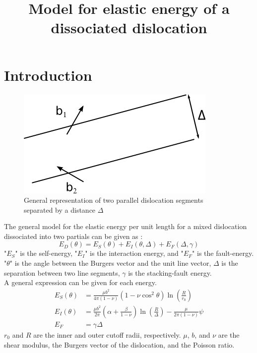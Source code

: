 \documentclass[10pt,a4paper,final]{article}
\title{Model for elastic energy of a dissociated dislocation}
\begin{document}
\section{Introduction}
\begin{figure}[hbp]
\centering
\includegraphics[scale=0.8]{png/parallel_disloc.png}
\caption{General representation of two parallel dislocation segments separated by a distance $\Delta$}
\end{figure}
The general model for the elastic energy per unit length for a mixed dislocation dissociated into two partials can be given as \cite{bacon78}:
\begin{equation}
E_D(\theta) = E_S(\theta) + E_I(\theta,\Delta) + E_F(\Delta,\gamma) \label{eqbacon}
\end{equation}
"$E_S$" is the self-energy, "$E_I$" is the interaction energy, and "$E_F$" is the fault-energy. "$\theta$" is the angle between the Burgers vector and the unit line vector, $\Delta$ is the separation between two line segments, $\gamma$ is the stacking-fault energy.\\

A general expression can be given for each energy.
\begin{subequations}
\begin{align}
E_S(\theta) & = \frac{\mu b^2}{4\pi(1-\nu)}\left(1-\nu\cos^2\theta\right)\ln\left(\frac{R}{r_0}\right) \label{eq:ltmodel}\\
E_I(\theta) & = \frac{\mu b^2}{2\pi}\left(\alpha+\frac{\beta}{1-\nu}\right)\ln\left(\frac{R}{\Delta}\right)-\frac{\mu}{2\pi(1-\nu)}\psi \label{eq:defEi}\\
E_F & = \gamma \Delta \label{eq:defEf}
\end{align}
\end{subequations}
$r_0$ and $R$ are the inner and outer cutoff radii, respectively. $\mu$, $b$, and $\nu$ are the shear modulus, the Burgers vector of the dislocation, and the Poisson ratio.\\
\end{document}

